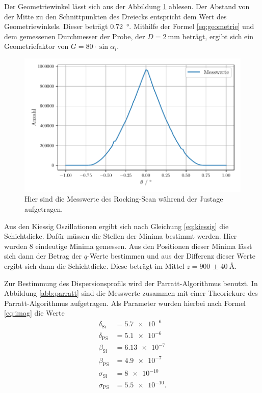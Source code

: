 Der Geometriewinkel lässt sich aus der Abbildung \ref{abb:dreieck} ablesen. Der Abstand von der Mitte zu den Schnittpunkten des Dreiecks entspricht dem Wert des Geometriewinkels. Dieser beträgt \SI{0.72}{\degree}. Mithilfe der Formel \ref{eq:geometrie} und dem gemessenen Durchmesser der Probe, der $D = \SI{2}{\milli\metre}$ beträgt, ergibt sich ein Geometriefaktor von $G = \num{80} \cdot \sin \alpha_i$.

\begin{figure}
    \centering
    \includegraphics[width=\textwidth]{figures/dreieck.pdf}
    \caption{Hier sind die Messwerte des Rocking-Scan während der Justage aufgetragen.}
    \label{abb:dreieck}
\end{figure}

Aus den Kiessig Oszillationen ergibt sich nach Gleichung \ref{eq:kiessig} die Schichtdicke. 
Dafür müssen die Stellen der Minima bestimmt werden. Hier wurden 8 eindeutige Minima gemessen. Aus den Positionen dieser Minima lässt sich dann der Betrag der $q$-Werte bestimmen und aus der Differenz dieser Werte ergibt sich dann die Schichtdicke. Diese beträgt im Mittel $z = \SI{900(40)}{\angstrom}$. 

Zur Bestimmung des Dispersionsprofils wird der Parratt-Algorithmus benutzt. 
In Abbildung \ref{abb:parratt} sind die Messwerte zusammen mit einer Theoriekure des Parratt-Algorithmus aufgetragen. 
Als Parameter wurden hierbei nach Formel \ref{eq:imag} die Werte 
\begin{align*}
 \delta_\text{Si} &= \num{5.7e-6}\\
 \delta_\text{PS} &= \num{5.1e-6} \\
 \beta_\text{Si} &= \num{6.13e-7}\\
 \beta_\text{PS} &= \num{4.9e-7} \\
 \sigma_\text{Si} &= \num{8e-10} \\
 \sigma_\text{PS} &= \num{5.5e-10}. \\
\end{align*}

